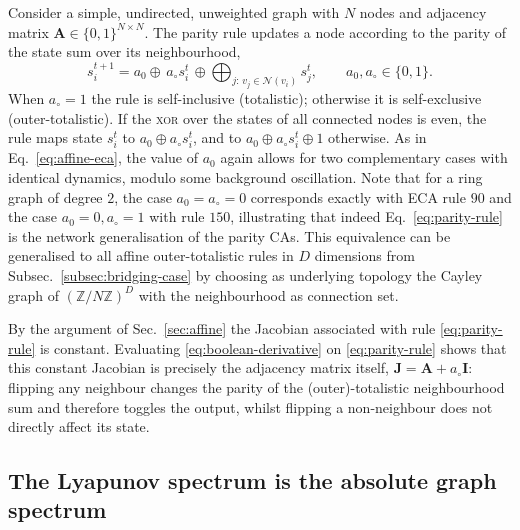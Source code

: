 \documentclass[a4paper,fleqn]{cas-dc}
\begin{document}
Consider a simple, undirected, unweighted graph with $N$ nodes and adjacency matrix $\mathbf{A}\in\{0,1\}^{N\times N}$. The parity rule updates a node according to the parity of the state sum over its neighbourhood,
\begin{equation}
    \label{eq:parity-rule}
    s_i^{t+1}=a_0\oplus\, a_\circ s_i^t\,\oplus\!\!\bigoplus_{j:\,v_j\in\mathcal{N}(v_i)}\!\!s_j^t,
    \qquad a_0, a_\circ\in\{0,1\}.
\end{equation}
When $a_\circ = 1$ the rule is self-inclusive (totalistic); otherwise it is self-exclusive (outer-totalistic). If the \textsc{xor} over the states of all connected nodes is even, the rule maps state $s_i^t$ to $a_0\oplus a_\circ s_i^t$, and to $a_0\oplus a_\circ s_i^t \oplus 1$ otherwise. As in Eq.~\eqref{eq:affine-eca}, the value of $a_0$ again allows for two complementary cases with identical dynamics, modulo some background oscillation. Note that for a ring graph of degree $2$, the case $a_0 = a_\circ = 0$ corresponds exactly with ECA rule $90$ and the case $a_0 = 0, a_\circ = 1$ with rule $150$, illustrating that indeed Eq.~\eqref{eq:parity-rule} is the network generalisation of the parity CAs. This equivalence can be generalised to all affine outer-totalistic rules in $D$ dimensions from Subsec.~\ref{subsec:bridging-case} by choosing as underlying topology the Cayley graph of $(\mathbb{Z}/N\mathbb{Z})^D$ with the neighbourhood as connection set.

By the argument of Sec.~\ref{sec:affine} the Jacobian associated with rule \eqref{eq:parity-rule} is constant. Evaluating \eqref{eq:boolean-derivative} on \eqref{eq:parity-rule} shows that this constant Jacobian is precisely the adjacency matrix itself, $\mathbf{J}=\mathbf{A} + a_\circ\mathbf{I}$: flipping any neighbour changes the parity of the (outer)-totalistic neighbourhood sum and therefore toggles the output, whilst flipping a non-neighbour does not directly affect its state.

\subsection{The Lyapunov spectrum is the absolute graph spectrum}
\end{document}
